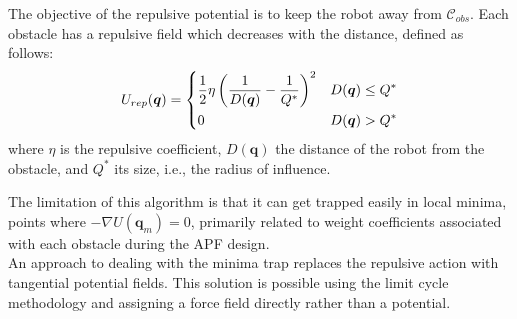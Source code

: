 The objective of the repulsive potential is to keep the robot away from $\mathcal{C}_{obs}$. Each obstacle has a repulsive field which decreases with the distance, defined as follows:
\begin{equation}
	U_{rep}(\bm{q})=
	\begin{dcases}
		\frac{1}{2}\eta \left(\frac{1}{D(\bm{q})}-\frac{1}{Q^*}\right)^2 & D(\bm{q})\leq Q^* \\
		0 & D(\bm{q})> Q^*
	\end{dcases}
\end{equation}
where $\eta$ is the repulsive coefficient, $D(\bm{q})$ the distance of the robot from the obstacle, and $Q^*$ its size, i.e., the radius of influence.




The limitation of this algorithm is that it can get trapped easily in local minima, points where $-\nabla U(\bm{q}_m)=0$, primarily related to weight coefficients associated with each obstacle during the APF design.\\
An approach to dealing with the minima trap replaces the repulsive action with tangential potential fields. This solution is possible using the limit cycle methodology and assigning a force field directly rather than a potential. 

